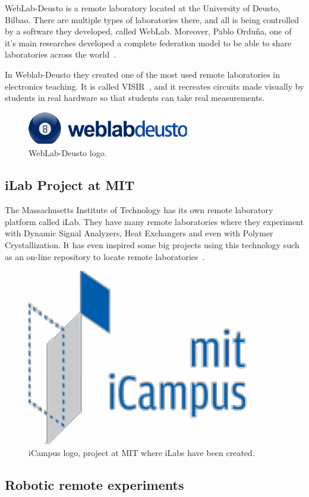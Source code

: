 WebLab-Deusto is a remote laboratory located at the University of Deusto, Bilbao. There are multiple
types of laboratories there, and all is being controlled by a software they developed, called
WebLab. Moreover, Pablo Orduña, one of it's main researches developed a complete federation model
to be able to share laboratories across the world~\cite{porduna_phd}.


In Weblab-Deusto they created one of the most used remote laboratories in electronics teaching. It
is called VISIR~\cite{visir}, and it recreates circuits made visually by students in real hardware
so that students can take real measurements.

\begin{figure}[h]
	\centering
	\includegraphics[width=.4\textwidth]{fig/weblab}
	\caption{WebLab-Deusto logo.}
\end{figure}

\subsection{iLab Project at MIT}

The Massachusetts Institute of Technology has its own remote laboratory platform called iLab. They
have many remote laboratories where they experiment with Dynamic Signal Analyzers, Heat Exchangers
and even with Polymer Crystallization. It has even inspired some big projects using this technology
such as an on-line repository to locate remote laboratories~\cite{ilabs_multi}.

\begin{figure}[h]
	\centering
	\includegraphics[width=.4\textwidth]{fig/icampus}
	\caption{iCampus logo, project at MIT where iLabs have been created.}
\end{figure}

\subsection{Robotic remote experiments}

